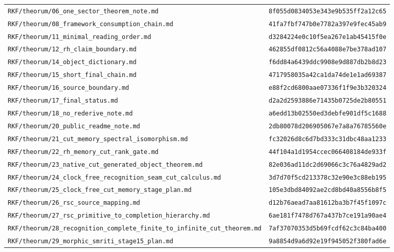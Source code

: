 \documentclass[11pt,openany]{book}
\begin{document}
\begin{small}
\begin{longtable}{p{}p{}}
\texttt{RKF/theorum/06\_one\_sector\_theorem\_note.md} & \texttt{8f055d0834053e343e9b535ff2a12c65}\\
\texttt{RKF/theorum/08\_framework\_consumption\_chain.md} & \texttt{41fa7fbf747b0e7782a397e9fec45ab9}\\
\texttt{RKF/theorum/11\_minimal\_reading\_order.md} & \texttt{d3284224e0c10f5ea267e1ab45415f0e}\\
\texttt{RKF/theorum/12\_rh\_claim\_boundary.md} & \texttt{462855df0812c56a4088e7be378ad107}\\
\texttt{RKF/theorum/14\_object\_dictionary.md} & \texttt{f6dd84a6439ddc9908e9d887db2b8d23}\\
\texttt{RKF/theorum/15\_short\_final\_chain.md} & \texttt{4717958035a42ca1da74de1e1ad69387}\\
\texttt{RKF/theorum/16\_source\_boundary.md} & \texttt{e88f2cd6800aae07336f1f9e3b320324}\\
\texttt{RKF/theorum/17\_final\_status.md} & \texttt{d2a2d2593886e71435b0725de2b80551}\\
\texttt{RKF/theorum/18\_no\_rederive\_note.md} & \texttt{a6edd13b02550ed3debfe901df5c1688}\\
\texttt{RKF/theorum/20\_public\_readme\_note.md} & \texttt{2db80078d206905067e7a8a76785560e}\\
\texttt{RKF/theorum/21\_cut\_memory\_spectral\_isomorphism.md} & \texttt{fc32026d8c6d7bd333c31dbc48aa1233}\\
\texttt{RKF/theorum/22\_rh\_memory\_cut\_rank\_gate.md} & \texttt{44f104a1d1954ccec066408184de933f}\\
\texttt{RKF/theorum/23\_native\_cut\_generated\_object\_theorem.md} & \texttt{82e036ad11dc2d69066c3c76a4829ad2}\\
\texttt{RKF/theorum/24\_clock\_free\_recognition\_seam\_cut\_calculus.md} & \texttt{3d7d70f5cd213378c32e90e3c88eb195}\\
\texttt{RKF/theorum/25\_clock\_free\_cut\_memory\_stage\_plan.md} & \texttt{105e3dbd84092ae2cd8bd40a8556b8f5}\\
\texttt{RKF/theorum/26\_rsc\_source\_mapping.md} & \texttt{d12b76aead7aa81612ba3b7f45f1097c}\\
\texttt{RKF/theorum/27\_rsc\_primitive\_to\_completion\_hierarchy.md} & \texttt{6ae181f7478d767a437b7ce191a90ae4}\\
\texttt{RKF/theorum/28\_recognition\_complete\_finite\_to\_infinite\_cut\_theorem.md} & \texttt{7af37070353d5b69fcdf62c3c84ba400}\\
\texttt{RKF/theorum/29\_morphic\_smriti\_stage15\_plan.md} & \texttt{9a8854d9a6d92e19f945052f380fad6e}\\

\end{longtable}
\end{small}
\end{document}
